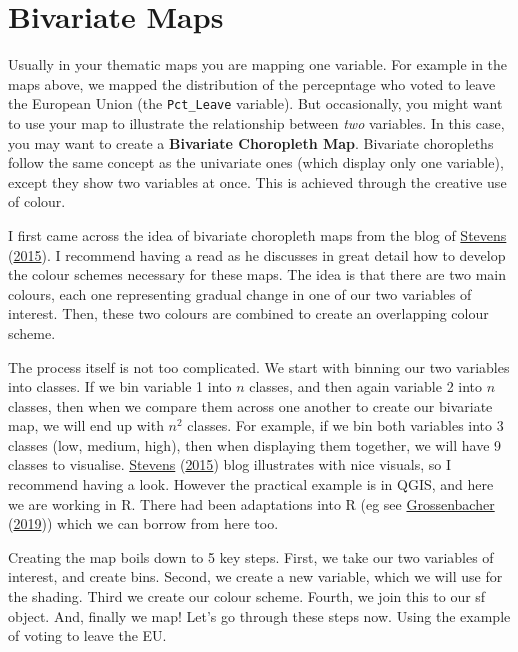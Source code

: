 \documentclass[
]{book}
\begin{document}
\hypertarget{bivariate-maps}{%
\section{Bivariate Maps}\label{bivariate-maps}}

Usually in your thematic maps you are mapping one variable. For example in the maps above, we mapped the distribution of the percepntage who voted to leave the European Union (the \texttt{Pct\_Leave} variable). But occasionally, you might want to use your map to illustrate the relationship between \emph{two} variables. In this case, you may want to create a \textbf{Bivariate Choropleth Map}. Bivariate choropleths follow the same concept as the univariate ones (which display only one variable), except they show two variables at once. This is achieved through the creative use of colour.

I first came across the idea of bivariate choropleth maps from the blog of \protect\hyperlink{ref-Stevens_2015}{Stevens} (\protect\hyperlink{ref-Stevens_2015}{2015}). I recommend having a read as he discusses in great detail how to develop the colour schemes necessary for these maps. The idea is that there are two main colours, each one representing gradual change in one of our two variables of interest. Then, these two colours are combined to create an overlapping colour scheme.

The process itself is not too complicated. We start with binning our two variables into classes. If we bin variable 1 into \(n\) classes, and then again variable 2 into \(n\) classes, then when we compare them across one another to create our bivariate map, we will end up with \(n^2\) classes. For example, if we bin both variables into 3 classes (low, medium, high), then when displaying them together, we will have 9 classes to visualise. \protect\hyperlink{ref-Stevens_2015}{Stevens} (\protect\hyperlink{ref-Stevens_2015}{2015}) blog illustrates with nice visuals, so I recommend having a look. However the practical example is in QGIS, and here we are working in R. There had been adaptations into R (eg see \protect\hyperlink{ref-Grossenbacher_2019}{Grossenbacher} (\protect\hyperlink{ref-Grossenbacher_2019}{2019})) which we can borrow from here too.

Creating the map boils down to 5 key steps. First, we take our two variables of interest, and create bins. Second, we create a new variable, which we will use for the shading. Third we create our colour scheme. Fourth, we join this to our sf object. And, finally we map! Let's go through these steps now. Using the example of voting to leave the EU.
\end{document}
